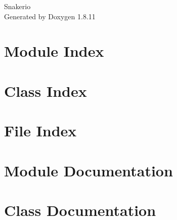 \documentclass[twoside]{book}
\newcommand{\+}{\discretionary{\mbox{\scriptsize$\hookleftarrow$}}{}{}}
\newcommand{\clearemptydoublepage}{%
  \newpage{\pagestyle{empty}\cleardoublepage}%
}
\begin{document}
\hypersetup{pageanchor=false,
             bookmarksnumbered=true,
             pdfencoding=unicode
            }
\begin{titlepage}
\vspace*{7cm}
\begin{center}%
{\Large Snakerio }\\
\vspace*{1cm}
{\large Generated by Doxygen 1.8.11}\\
\end{center}
\end{titlepage}
\clearemptydoublepage
\tableofcontents
\clearemptydoublepage
{}
\hypersetup{pageanchor=true}

\chapter{Module Index}

\chapter{Class Index}

\chapter{File Index}

\chapter{Module Documentation}














\chapter{Class Documentation}










\end{document}
